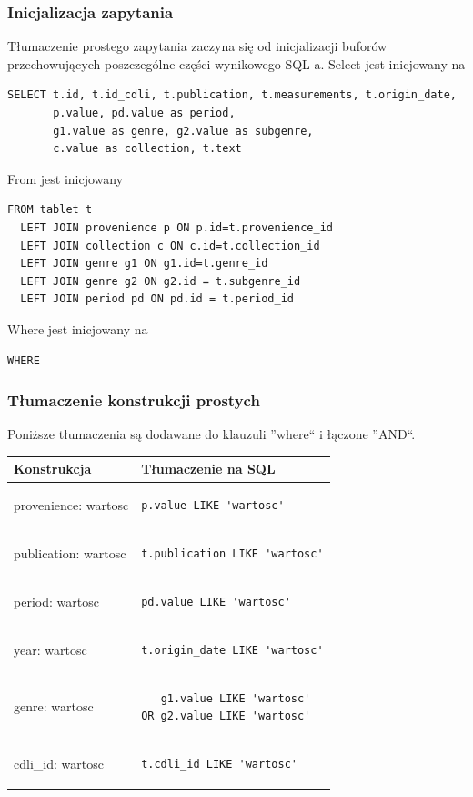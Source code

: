 \documentclass{pracamgr}
\begin{document}
\subsubsection{Inicjalizacja zapytania}
Tłumaczenie prostego zapytania zaczyna się od inicjalizacji buforów przechowujących poszczególne części wynikowego SQL-a.
Select jest inicjowany na 
\begin{verbatim}
SELECT t.id, t.id_cdli, t.publication, t.measurements, t.origin_date, 
       p.value, pd.value as period,
       g1.value as genre, g2.value as subgenre, 
       c.value as collection, t.text
\end{verbatim}
From jest inicjowany
\begin{verbatim}
FROM tablet t
  LEFT JOIN provenience p ON p.id=t.provenience_id
  LEFT JOIN collection c ON c.id=t.collection_id
  LEFT JOIN genre g1 ON g1.id=t.genre_id
  LEFT JOIN genre g2 ON g2.id = t.subgenre_id
  LEFT JOIN period pd ON pd.id = t.period_id
\end{verbatim}
Where jest inicjowany na
\begin{verbatim}
WHERE
\end{verbatim}


\subsubsection{Tłumaczenie konstrukcji prostych}
Poniższe tłumaczenia są dodawane do klauzuli ''where`` i łączone ''AND``.
\begin{longtable}{|p{3in}|p{3in}|}
\hline
{\bf Konstrukcja} & {\bf Tłumaczenie na SQL}\\
\hline
\endhead
provenience: wartosc & \begin{verbatim}p.value LIKE 'wartosc'\end{verbatim}
\\
\hline
publication: wartosc & 
\begin{verbatim}
t.publication LIKE 'wartosc'
\end{verbatim}
\\
\hline
period: wartosc & 
\begin{verbatim}
pd.value LIKE 'wartosc'
\end{verbatim}
\\
\hline
year: wartosc & 
\begin{verbatim}
t.origin_date LIKE 'wartosc'
\end{verbatim}
\\
\hline
genre: wartosc & 
\begin{verbatim}
   g1.value LIKE 'wartosc' 
OR g2.value LIKE 'wartosc'
\end{verbatim}
\\
\hline
cdli\_id: wartosc & 
\begin{verbatim}
t.cdli_id LIKE 'wartosc'
\end{verbatim}
\\
\hline
\end{longtable}
\end{document}
